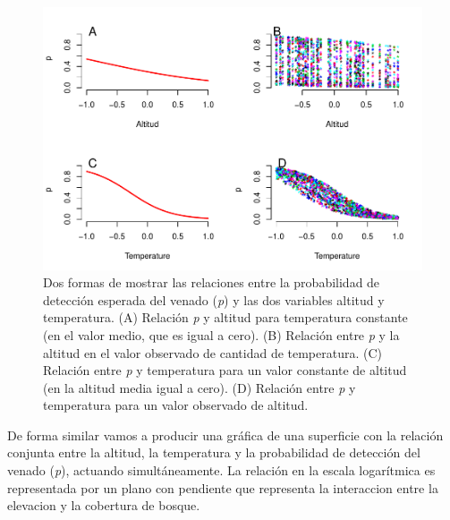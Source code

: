 \documentclass[]{book}
\begin{document}
\begin{figure}[htbp]
\centering
\includegraphics{Simul-Machalilla-book_files/figure-latex/graph4-1.pdf}
\caption{\label{fig:graph4}Dos formas de mostrar las relaciones entre la
probabilidad de detección esperada del venado (\emph{p}) y las dos
variables altitud y temperatura. (A) Relación \emph{p} y altitud para
temperatura constante (en el valor medio, que es igual a cero). (B)
Relación entre \emph{p} y la altitud en el valor observado de cantidad
de temperatura. (C) Relación entre \emph{p} y temperatura para un valor
constante de altitud (en la altitud media igual a cero). (D) Relación
entre \emph{p} y temperatura para un valor observado de altitud.}
\end{figure}

De forma similar vamos a producir una gráfica de una superficie con la
relación conjunta entre la altitud, la temperatura y la probabilidad de
detección del venado (\emph{p}), actuando simultáneamente. La relación
en la escala logarítmica es representada por un plano con pendiente que
representa la interaccion entre la elevacion y la cobertura de bosque.
\end{document}
